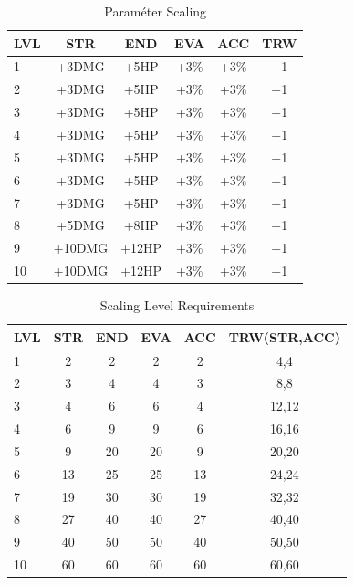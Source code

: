 \begin{table}[!ht]
    \centering
    \caption{Paraméter Scaling}
    \label{table:scalingtable}
    \begin{tabular}{|l|c|c|c|c|c|}
    \hline
    LVL & STR  & END & EVA & ACC & TRW \\
    \hline
    1 & +3DMG & +5HP & +3\% & +3\% & +1 \\
    \hline
    2 & +3DMG & +5HP & +3\% & +3\% & +1 \\
    \hline
    3 & +3DMG & +5HP & +3\% & +3\% & +1 \\
    \hline
    4 & +3DMG & +5HP & +3\% & +3\% & +1 \\
    \hline
    5 & +3DMG & +5HP & +3\% & +3\% & +1 \\
    \hline
    6 & +3DMG & +5HP & +3\% & +3\% & +1 \\
    \hline
    7 & +3DMG & +5HP & +3\% & +3\% & +1 \\
    \hline
    8 & +5DMG & +8HP & +3\% & +3\% & +1 \\
    \hline
    9 & +10DMG & +12HP & +3\% & +3\% & +1 \\
    \hline
    10 & +10DMG & +12HP & +3\% & +3\% & +1 \\
    \hline
    \end{tabular}
\end{table}

\begin{table}[!ht]
    \centering
    \caption{Scaling Level Requirements}
    \label{table:scalingleveltable}
    \begin{tabular}{|l|c|c|c|c|c|}
        \hline
        LVL & STR  & END & EVA & ACC & TRW(STR,ACC) \\
        \hline
        1 & 2 & 2 & 2 & 2 & 4,4 \\
        \hline
        2 & 3 & 4 & 4 & 3 & 8,8 \\
        \hline
        3 & 4 & 6 & 6 & 4 & 12,12 \\
        \hline
        4 & 6 & 9 & 9 & 6 & 16,16 \\
        \hline
        5 & 9 & 20 & 20 & 9 & 20,20 \\
        \hline
        6 & 13 & 25 & 25 & 13 & 24,24 \\
        \hline
        7 & 19 & 30 & 30 & 19 & 32,32 \\
        \hline
        8 & 27 & 40 & 40 & 27 & 40,40 \\
        \hline
        9 & 40 & 50 & 50 & 40 & 50,50 \\
        \hline
        10 & 60 & 60 & 60 & 60 & 60,60 \\
        \hline
    \end{tabular}
\end{table}

